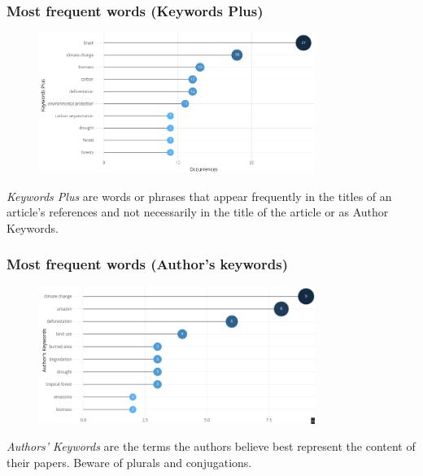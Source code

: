\documentclass[aspectratio=169]{beamer}
\begin{document}
\begin{frame}
  \frametitle{Most frequent words (Keywords Plus)}
  \begin{figure}
    \centering
    \includegraphics[width=0.8\textwidth]
    {img/most_frequent_words_keywords_plus.png}
    \label{fig:most_frequent_words_keywords_plus}
  \end{figure}
  \emph{Keywords Plus} are words or phrases that appear frequently in the 
  titles of an article's references and not necessarily in the title of the 
  article or as Author Keywords.
\end{frame}

\begin{frame}
  \frametitle{Most frequent words (Author's keywords)}
  \begin{figure}
    \centering
    \includegraphics[width=0.8\textwidth]
    {img/most_frequent_words_authors_keywords.png}
    \label{fig:most_frequent_words_authors_keywords}
  \end{figure}
  \emph{Authors' Keywords} are the terms the authors believe best represent
  the content of their papers. Beware of plurals and conjugations.
\end{frame}
\end{document}
